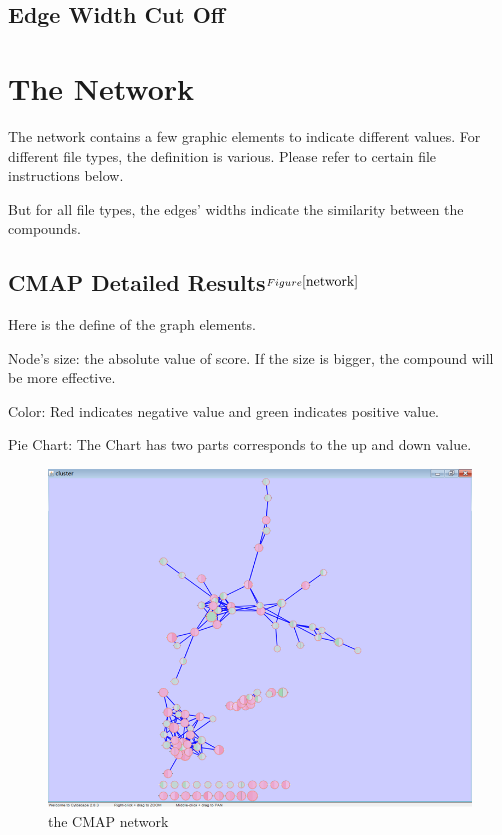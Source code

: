 \documentclass{article}
\begin{document}
\subsection{Edge Width Cut Off}


\section{The Network}
The network contains a few graphic elements to indicate different values. For
different file types, the definition is various. Please refer to certain file
instructions below.

But for all file types, the edges’ widths indicate the similarity between the
compounds.

\subsection{CMAP Detailed Results$^{Figure \ref{network}}$}
Here is the define of the graph elements.

Node’s size: the absolute value of score. If the size is bigger, the compound will be more effective.

Color: Red indicates negative value and green indicates positive value.

Pie Chart: The Chart has two parts corresponds to the up and down value.

\begin{figure}[ht!]
	\centering
	\includegraphics[width=1\textwidth]{network.png}
	\caption{the CMAP network\protect\footnotemark}
	\label{network}
\end{figure}
\end{document}
